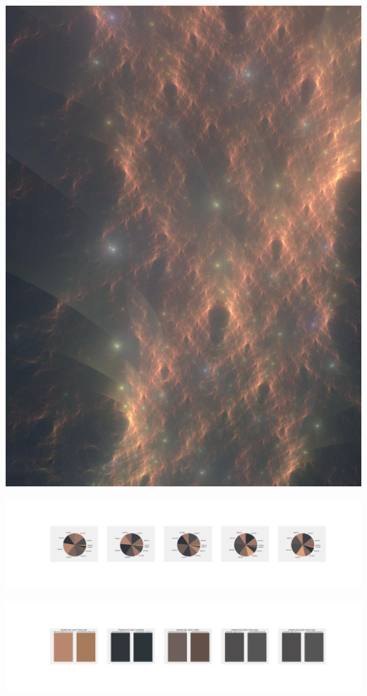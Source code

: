 \documentclass[11pt]{article}
\begin{document}
\begin{landscape}
    \begin{center}
    \includegraphics[width=\textwidth]{./nbimg/file (148).jpg}
    \end{center}

    \begin{center}
    \includegraphics[width=250mm]{./nbimg/pie-54.jpg}
    \end{center}

    \begin{center}
    \includegraphics[width=250mm]{./nbimg/peak-54.jpg}
    \end{center}
    


\end{landscape}
\end{document}

